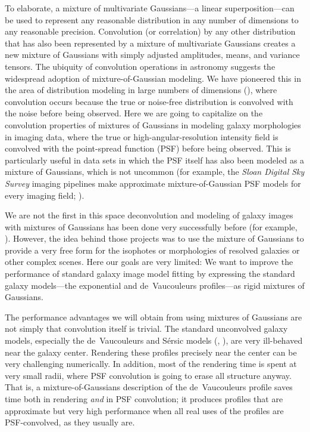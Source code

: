 \documentclass[12pt,pdftex,preprint]{aastex}
\newcommand{\project}[1]{\textsl{#1}}
\begin{document}
To elaborate, a mixture of multivariate Gaussians---a linear
superposition---can be used to represent any reasonable distribution
in any number of dimensions to any reasonable precision.  Convolution
(or correlation) by any other distribution that has also been
represented by a mixture of multivariate Gaussians creates a new
mixture of Gaussians with simply adjusted amplitudes, means, and
variance tensors.  The ubiquity of convolution operations in astronomy
suggests the widespread adoption of mixture-of-Gaussian modeling.  We
have pioneered this in the area of distribution modeling in large
numbers of dimensions (\citealt{xd, xdqso, xdqsoz}), where convolution
occurs because the true or noise-free distribution is convolved with
the noise before being observed.  Here we are going to capitalize on
the convolution properties of mixtures of Gaussians in modeling galaxy
morphologies in imaging data, where the true or
high-angular-resolution intensity field is convolved with the
point-spread function (PSF) before being observed.  This is
particularly useful in data sets in which the PSF itself has also been
modeled as a mixture of Gaussians, which is not uncommon (for example,
the \project{Sloan Digital Sky Survey} imaging pipelines
make approximate mixture-of-Gaussian PSF models for
every imaging field; \citealt{lupton}).

We are not the first in this space deconvolution and modeling of
galaxy images with mixtures of Gaussians has been done very
successfully before (for example, \citealt{bendinelli, emsellem,
  bendinelli2, cappellari}).  However, the idea behind those projects
was to use the mixture of Gaussians to provide a very free form for
the isophotes or morphologies of resolved galaxies or other complex
scenes.  Here our goals are very limited: We want to improve the
performance of standard galaxy image model fitting by expressing the
standard galaxy models---the exponential and de~Vaucouleurs
profiles---as rigid mixtures of Gaussians.

The performance advantages we will obtain from using mixtures of
Gaussians are not simply that convolution itself is trivial.  The
standard unconvolved galaxy models, especially the de~Vaucouleurs and
S\'ersic models (\citealt{dev}, \citealt{ser}), are very ill-behaved
near the galaxy center.  Rendering these profiles precisely near the
center can be very challenging numerically.  In addition, most of the
rendering time is spent at very small radii, where PSF convolution is
going to erase all structure anyway.  That is, a mixture-of-Gaussians
description of the de~Vaucouleurs profile saves time both in rendering
\emph{and} in PSF convolution; it produces profiles that are
approximate but very high performance when all real uses of the
profiles are PSF-convolved, as they usually are.
\end{document}

